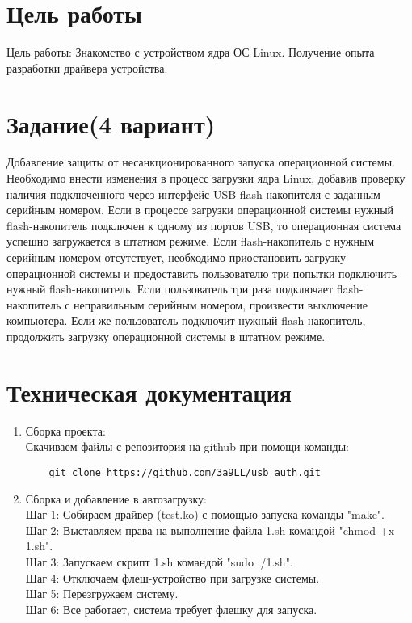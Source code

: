 \documentclass[a4paper]{article}
\begin{document}
\newpage

\section{Цель работы}

\normalsize Цель работы: Знакомство с устройством ядра ОС Linux. Получение опыта разработки драйвера устройства.

\section{Задание(4 вариант)}

Добавление защиты от несанкционированного запуска операционной системы.
Необходимо внести изменения в процесс загрузки ядра Linux, добавив проверку наличия
подключенного через интерфейс USB flash-накопителя с заданным серийным номером.
Если в процессе загрузки операционной системы нужный flash-накопитель подключен к
одному из портов USB, то операционная система успешно загружается в штатном режиме.
Если flash-накопитель с нужным серийным номером отсутствует, необходимо
приостановить загрузку операционной системы и предоставить пользователю три попытки
подключить нужный flash-накопитель. Если пользователь три раза подключает flash-
накопитель с неправильным серийным номером, произвести выключение компьютера.
Если же пользователь подключит нужный flash-накопитель, продолжить загрузку
операционной системы в штатном режиме.

\section{Техническая документация}
\begin{enumerate}
	\item Сборка проекта: \\
		Скачиваем файлы с репозитория на github при помощи команды: \begin{verbatim}
	git clone https://github.com/3a9LL/usb_auth.git
\end{verbatim} 
	\item Сборка и добавление в автозагрузку: \\
	Шаг 1: Собираем драйвер (test.ko) с помощью запуска команды "make".
	 \\
	Шаг 2: Выставляем права на выполнение файла 1.sh командой "chmod +x 1.sh".
	  \\
	Шаг 3: Запускаем скрипт 1.sh командой "sudo ./1.sh".
	  \\
	Шаг 4: Отключаем флеш-устройство при загрузке системы.
	 \\
	Шаг 5: Перезгружаем систему.
	  \\
	Шаг 6:	Все работает, система требует флешку для запуска.
\end{enumerate}
\newpage
\end{document}
